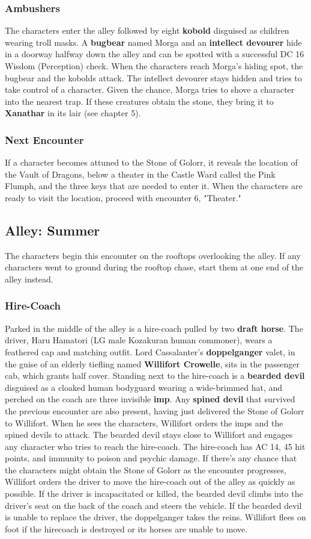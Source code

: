 \documentclass[10pt,a4paper,twoside,twocolumn,openany,nodeprecatedcode]{dndbook}
\begin{document}
\subsubsection{Ambushers}
The characters enter the alley followed by eight \textbf{kobold} disguised as children wearing troll masks. A \textbf{bugbear} named Morga and an \textbf{intellect devourer} hide in a doorway halfway down the alley and can be spotted with a successful DC 16 Wisdom (Perception) check.
When the characters reach Morga's hiding spot, the bugbear and the kobolds attack. The intellect devourer stays hidden and tries to take control of a character. Given the chance, Morga tries to shove a character into the nearest trap. If these creatures obtain the stone, they bring it to \textbf{Xanathar} in its lair (see chapter 5).
\subsubsection{Next Encounter}
If a character becomes attuned to the Stone of Golorr, it reveals the location of the Vault of Dragons, below a theater in the Castle Ward called the Pink Flumph, and the three keys that are needed to enter it. When the characters are ready to visit the location, proceed with encounter 6, "Theater."
\subsection{Alley: Summer}
The characters begin this encounter on the rooftops overlooking the alley. If any characters went to ground during the rooftop chase, start them at one end of the alley instead.
\subsubsection{Hire-Coach}
Parked in the middle of the alley is a hire-coach pulled by two \textbf{draft horse}. The driver, Haru Hamatori (LG male Kozakuran human commoner), wears a feathered cap and matching outfit.
Lord Cassalanter's \textbf{doppelganger} valet, in the guise of an elderly tiefling named \textbf{Willifort Crowelle}, sits in the passenger cab, which grants half cover. Standing next to the hire-coach is a \textbf{bearded devil} disguised as a cloaked human bodyguard wearing a wide-brimmed hat, and perched on the coach are three invisible \textbf{imp}. Any \textbf{spined devil} that survived the previous encounter are also present, having just delivered the Stone of Golorr to Willifort.
When he sees the characters, Willifort orders the imps and the spined devils to attack. The bearded devil stays close to Willifort and engages any character who tries to reach the hire-coach.
The hire-coach has AC 14, 45 hit points, and immunity to poison and psychic damage.
If there's any chance that the characters might obtain the Stone of Golorr as the encounter progresses, Willifort orders the driver to move the hire-coach out of the alley as quickly as possible. If the driver is incapacitated or killed, the bearded devil climbs into the driver's seat on the back of the coach and steers the vehicle. If the bearded devil is unable to replace the driver, the doppelganger takes the reins. Willifort flees on foot if the hirecoach is destroyed or its horses are unable to move.
\end{document}
